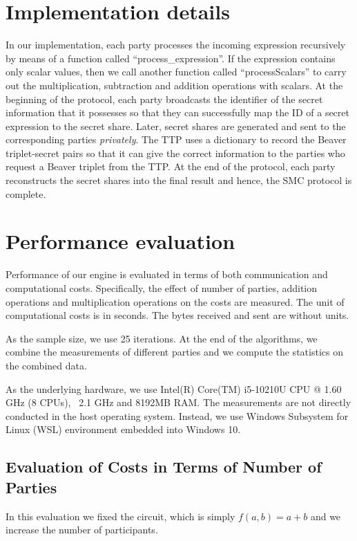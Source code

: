 \documentclass[9pt,conference]{IEEEtran}
\begin{document}
\section{Implementation details}
In our implementation, each party processes the incoming expression recursively by means of a function called ``process\_expression''. If the expression contains only scalar values, then we call another function called ``processScalars'' to carry out the multiplication, subtraction and addition operations with scalars. At the beginning of the protocol, each party broadcasts the identifier of the secret information that it possesses so that they can successfully map the ID of a secret expression to the secret share. Later, secret shares are generated and sent to the corresponding parties \textit{privately}. The TTP uses a dictionary to record the Beaver triplet-secret pairs so that it can give the correct information to the parties who request a Beaver triplet from the TTP. At the end of the protocol, each party reconstructs the secret shares into the final result and hence, the SMC protocol is complete.

\section{Performance evaluation}
Performance of our engine is evaluated in terms of both communication and computational costs. Specifically, the effect of number of parties, addition operations and multiplication operations on the costs are measured. The unit of computational costs is in seconds. The bytes received and sent are without units.

As the sample size, we use 25 iterations. At the end of the algorithms, we combine the measurements of different parties and we compute the statistics on the combined data.

As the underlying hardware, we use Intel(R) Core(TM) i5-10210U CPU @ 1.60 GHz (8 CPUs), ~2.1 GHz and 8192MB RAM. The measurements are not directly conducted in the host operating system. Instead, we use Windows Subsystem for Linux (WSL) environment embedded into Windows 10.

\subsection{Evaluation of Costs in Terms of Number of Parties}
In this evaluation we fixed the circuit, which is simply $f(a,b)=a+b$ and we increase the number of participants.
\end{document}
